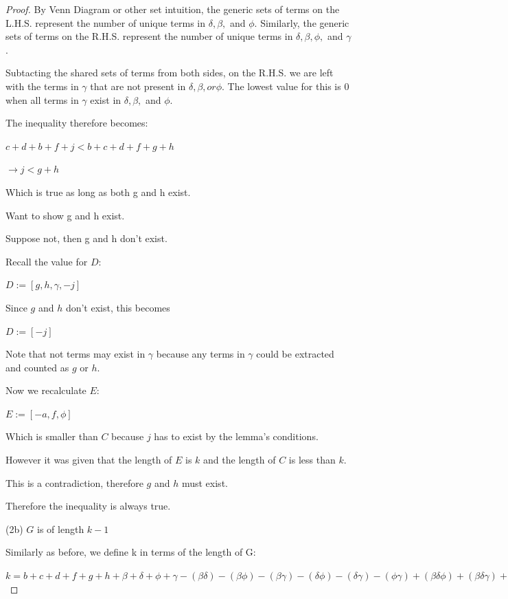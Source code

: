\documentclass[manuscript]{acmart}
\begin{document}
\begin{proof}
        By Venn Diagram or other set intuition, 
        the generic sets of terms on the L.H.S. represent the number 
        of unique terms in $\delta, \beta,$ and $\phi$. Similarly, 
        the generic sets of terms on the R.H.S. represent the number
        of unique terms in $\delta, \beta, \phi,$ and $\gamma$.

        Subtacting the shared sets of terms from both sides, on
        the R.H.S. we are left
        with the terms in $\gamma$ that are not present in 
        $\delta, \beta, or \phi$. The lowest value for this is 0 when
        all terms in $\gamma$ exist in $\delta, \beta,$ and $\phi$.

        The inequality therefore becomes:

        $c + d + b + f + j < b + c + d + f + g + h$

        $\rightarrow j < g + h$

        Which is true as long as both g and h exist.

        Want to show g and h exist.

        Suppose not, then g and h don't exist.

        Recall the value for $D$:

        $D := [g, h, \gamma, -j]$

        Since $g$ and $h$ don't exist, this becomes

        $D := [-j]$

        Note that not terms may exist in $\gamma$ because any terms in $\gamma$
        could be extracted and counted as $g$ or $h$.

        Now we recalculate $E$:

        $E := [-a, f, \phi]$

        Which is smaller than $C$ because $j$ has to exist by the lemma's conditions.

        However it was given that the length of $E$ is $k$ and the length of $C$
        is less than $k$.

        This is a contradiction, therefore $g$ and $h$ must exist.

        Therefore the inequality is always true.

        (2b) $G$ is of length $k - 1$

        Similarly as before, we define k in terms of the length of G:

        $k = b + c + d + f + g + h
            + \beta + \delta + \phi + \gamma
            - (\beta \delta) - (\beta \phi) - (\beta \gamma) - (\delta \phi) - (\delta \gamma) -(\phi \gamma)
            + (\beta \delta \phi) + (\beta \delta \gamma) + (\beta \phi \gamma) + (\delta \phi \gamma)
            - (\beta \delta \phi \gamma)
            + 1
        $


\end{proof}
\end{document}
